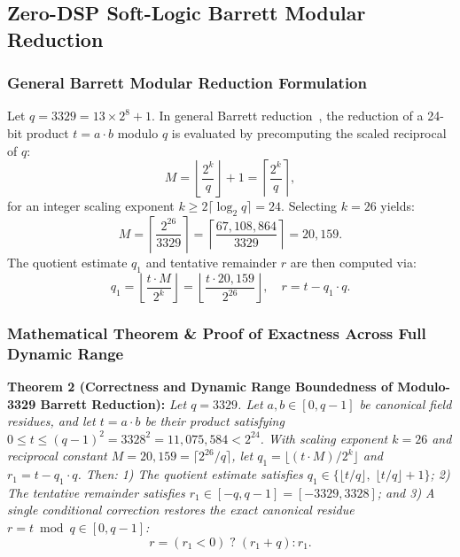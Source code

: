 \subsection{Zero-DSP Soft-Logic Barrett Modular Reduction}
\label{sec:barrett_reducer}

\subsubsection{General Barrett Modular Reduction Formulation}
Let $q = 3329 = 13 \times 2^8 + 1$. In general Barrett reduction~\cite{barrett1986}, the reduction of a 24-bit product $t = a \cdot b$ modulo $q$ is evaluated by precomputing the scaled reciprocal of $q$:
\begin{equation}
\label{eq:barrett_general_reciprocal}
M = \left\lfloor \frac{2^k}{q} \right\rfloor + 1 = \left\lceil \frac{2^k}{q} \right\rceil,
\end{equation}
for an integer scaling exponent $k \ge 2\lceil\log_2 q\rceil = 24$. Selecting $k = 26$ yields:
\begin{equation}
\label{eq:m_26_val}
M = \left\lceil \frac{2^{26}}{3329} \right\rceil = \left\lceil \frac{67,108,864}{3329} \right\rceil = 20,159.
\end{equation}
The quotient estimate $q_1$ and tentative remainder $r$ are then computed via:
\begin{equation}
\label{eq:barrett_classic_ops}
q_1 = \left\lfloor \frac{t \cdot M}{2^k} \right\rfloor = \left\lfloor \frac{t \cdot 20,159}{2^{26}} \right\rfloor, \quad r = t - q_1 \cdot q.
\end{equation}

\subsubsection{Mathematical Theorem \& Proof of Exactness Across Full Dynamic Range}

\noindent\textbf{Theorem 2 (Correctness and Dynamic Range Boundedness of Modulo-3329 Barrett Reduction):}
\label{thm:barrett_exact}
\textit{Let $q = 3329$. Let $a, b \in [0, q-1]$ be canonical field residues, and let $t = a \cdot b$ be their product satisfying $0 \le t \le (q-1)^2 = 3328^2 = 11,075,584 < 2^{24}$. With scaling exponent $k = 26$ and reciprocal constant $M = 20,159 = \lceil 2^{26}/q \rceil$, let $q_1 = \lfloor (t \cdot M)/2^k \rfloor$ and $r_1 = t - q_1 \cdot q$. Then:
1) The quotient estimate satisfies $q_1 \in \{ \lfloor t/q \rfloor, \; \lfloor t/q \rfloor + 1 \}$;
2) The tentative remainder satisfies $r_1 \in [-q, q-1] = [-3329, 3328]$; and
3) A single conditional correction restores the exact canonical residue $r = t \bmod q \in [0, q-1]$:
\begin{equation}
\label{eq:cond_corr_thm}
r = (r_1 < 0) \; ? \; (r_1 + q) : r_1.
\end{equation}}

